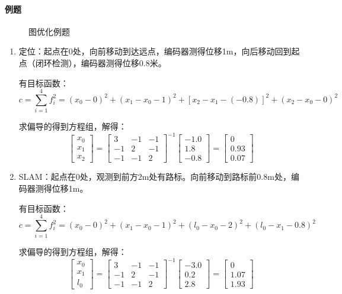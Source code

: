 \documentclass[
12pt, %
a4paper, 
oneside, %
headinclude,footinclude, %
]{scrartcl}
\begin{document}
\paragraph{例题}
\begin{figure}[H]
\centering
{} \quad
{}
\caption{图优化例题}
\end{figure}

\begin{enumerate}
\item 定位：起点在0处，向前移动到达远点，编码器测得位移1m，向后移动回到起点（闭环检测），编码器测得位移0.8米。

有目标函数：
$$ c = \sum_{i = 1}^{4} f_i^2 = (x_0 - 0)^2 + (x_1 - x_0 - 1)^2 + [x_2 - x_1 -(-0.8)]^2 +(x_2 - x_0 - 0)^2 $$

求偏导的得到方程组，解得：
$$
\begin{bmatrix}  x_0 \\ x_1 \\ x_2 \end{bmatrix} 
= \begin{bmatrix} 3 & -1 & -1 \\ -1 & 2 & -1 \\ -1 & -1 & 2 \end{bmatrix}^{-1}
\begin{bmatrix} -1.0 \\ 1.8 \\ -0.8 \end{bmatrix} 
= \begin{bmatrix} 0 \\ 0.93 \\ 0.07 \end{bmatrix}
$$
\item SLAM：起点在0处，观测到前方2m处有路标。向前移动到路标前0.8m处，编码器测得位移1m。

有目标函数：
$$ c = \sum_{i = 1}^{4} f_i^2 = (x_0 - 0)^2 + (x_1 - x_0 - 1)^2 + (l_0 - x_0 - 2)^2 +(l_0 - x_1 - 0.8)^2 $$

求偏导的得到方程组，解得：
$$
\begin{bmatrix}  x_0 \\ x_1 \\ l_0 \end{bmatrix} 
= \begin{bmatrix} 3 & -1 & -1 \\ -1 & 2 & -1 \\ -1 & -1 & 2 \end{bmatrix}^{-1}
\begin{bmatrix} -3.0 \\ 0.2 \\ 2.8 \end{bmatrix} 
= \begin{bmatrix} 0 \\ 1.07 \\ 1.93 \end{bmatrix}
$$
\end{enumerate}
\end{document}
